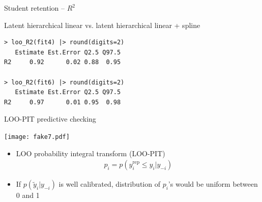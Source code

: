 \documentclass[english,t]{beamer}
\DeclareMathOperator{\rep}{\mathrm{rep}}
\begin{document}
\begin{frame}[fragile]{Student retention -- $R^2$}

Latent hierarchical linear vs. latent hierarchical linear + spline
  
{\small
\begin{lstlisting}
> loo_R2(fit4) |> round(digits=2)
   Estimate Est.Error Q2.5 Q97.5
R2     0.92      0.02 0.88  0.95

> loo_R2(fit6) |> round(digits=2)
   Estimate Est.Error Q2.5 Q97.5
R2     0.97      0.01 0.95  0.98
\end{lstlisting}}

\end{frame}

\begin{frame}{LOO-PIT predictive checking}

  \vspace{-0.5\baselineskip}
  \texttt{[image: fake7.pdf]}
  
  \vspace{-0.5\baselineskip}
  \begin{itemize}
  \item LOO probability integral transform (LOO-PIT)
    \begin{align*}
      p_i = p(y_i^{\rep} \leq y_i | y_{-i})
    \end{align*}
  \item If $p(\tilde{y}_i|y_{-i})$ is well calibrated, distribution of $p_i$'s
    would be uniform between 0 and 1
  \end{itemize}

\end{frame}
\end{document}
